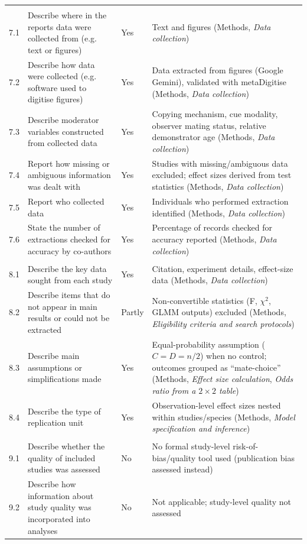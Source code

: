 \begin{longtable}{@{}p{0.9cm} p{5.5cm} p{1.4cm} p{6.0cm}@{}}
\addlinespace
\multicolumn{4}{@{}l}{\textbf{Data collection process}}\\
7.1 & Describe where in the reports data were collected from (e.g. text or figures) & Yes & Text and figures (Methods, \emph{Data collection}) \\
7.2 & Describe how data were collected (e.g. software used to digitise figures) & Yes & Data extracted from figures (Google Gemini), validated with metaDigitise (Methods, \emph{Data collection}) \\
7.3 & Describe moderator variables constructed from collected data & Yes & Copying mechanism, cue modality, observer mating status, relative demonstrator age (Methods, \emph{Data collection}) \\
7.4 & Report how missing or ambiguous information was dealt with & Yes & Studies with missing/ambiguous data excluded; effect sizes derived from test statistics (Methods, \emph{Data collection}) \\
7.5 & Report who collected data & Yes & Individuals who performed extraction identified (Methods, \emph{Data collection}) \\
7.6 & State the number of extractions checked for accuracy by co-authors & Yes & Percentage of records checked for accuracy reported (Methods, \emph{Data collection}) \\

\addlinespace
\multicolumn{4}{@{}l}{\textbf{Data items}}\\
8.1 & Describe the key data sought from each study & Yes & Citation, experiment details, effect-size data (Methods, \emph{Data collection}) \\
8.2 & Describe items that do not appear in main results or could not be extracted & Partly & Non-convertible statistics (F, $\chi^2$, GLMM outputs) excluded (Methods, \emph{Eligibility criteria and search protocols}) \\
8.3 & Describe main assumptions or simplifications made & Yes & Equal-probability assumption ($C=D=n/2$) when no control; outcomes grouped as ``mate-choice'' (Methods, \emph{Effect size calculation}, \emph{Odds ratio from a $2\times2$ table}) \\
8.4 & Describe the type of replication unit & Yes & Observation-level effect sizes nested within studies/species (Methods, \emph{Model specification and inference}) \\

\addlinespace
\multicolumn{4}{@{}l}{\textbf{Assessment of individual study quality}}\\
9.1 & Describe whether the quality of included studies was assessed & No & No formal study-level risk-of-bias/quality tool used (publication bias assessed instead) \\
9.2 & Describe how information about study quality was incorporated into analyses & No & Not applicable; study-level quality not assessed \\


\end{longtable}
